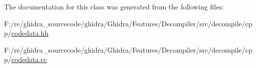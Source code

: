 The documentation for this class was generated from the following files\+:\begin{DoxyCompactItemize}
\item 
F\+:/re/ghidra\+\_\+sourcecode/ghidra/\+Ghidra/\+Features/\+Decompiler/src/decompile/cpp/\mbox{\hyperlink{codedata_8hh}{codedata.\+hh}}\item 
F\+:/re/ghidra\+\_\+sourcecode/ghidra/\+Ghidra/\+Features/\+Decompiler/src/decompile/cpp/\mbox{\hyperlink{codedata_8cc}{codedata.\+cc}}\end{DoxyCompactItemize}
